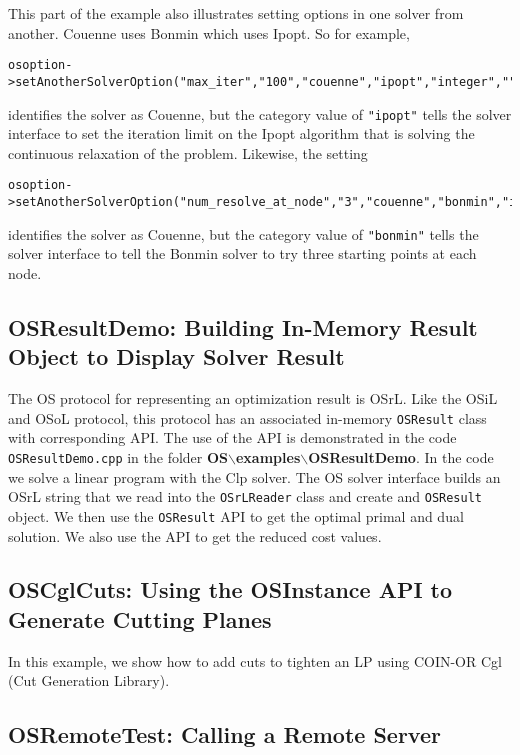 \documentclass[11pt]{article}
\renewcommand{\{}{{\char"7B}}
\renewcommand{\}}{{\char"7D}}
\renewcommand{\^}{{\char"0D}}
\renewcommand{\'}{{\char"0D}}
\begin{document}
This part of the example also illustrates setting options in one solver from another. 
Couenne uses Bonmin which uses Ipopt.  So for example,

\begin{verbatim}
osoption->setAnotherSolverOption("max_iter","100","couenne","ipopt","integer","");
\end{verbatim}
identifies the solver as Couenne, but the category value of {\tt "ipopt"}  tells the solver 
interface to set the iteration limit on the Ipopt algorithm that is solving the continuous relaxation 
of the problem.  Likewise, the setting
\begin{verbatim}
osoption->setAnotherSolverOption("num_resolve_at_node","3","couenne","bonmin","integer","");
\end{verbatim}
identifies the solver as Couenne, but the category value of {\tt "bonmin"}  tells the solver 
interface to tell the Bonmin solver to try three starting points at each node. 

 

\subsection{OSResultDemo: Building In-Memory Result Object to Display Solver Result}\label{section:exampleOSResultDemo}

The OS protocol for representing an optimization result is OSrL. Like the OSiL and 
OSoL protocol, this protocol has an associated in-memory {\tt OSResult} class with 
corresponding API.  The use of the API is demonstrated in the code {\tt OSResultDemo.cpp} 
in the folder {\bf OS$\backslash$examples$\backslash$OSResultDemo}.  In the code we solve a linear program with the 
Clp solver.  The OS solver interface builds an OSrL string that we read into the 
{\tt OSrLReader} class and create and {\tt OSResult} object. We then use the {\tt OSResult} 
API to get the optimal primal and dual solution. We also use the API to get the reduced cost values. 


\subsection{OSCglCuts: Using the OSInstance API to Generate Cutting Planes}\label{section:exampleOSAddCuts}

In this example, we show how to add cuts to tighten an LP using COIN-OR  
Cgl (Cut Generation Library).

\subsection{OSRemoteTest:  Calling a Remote Server}\label{section:exampleOSRemoteTest}
\end{document}
